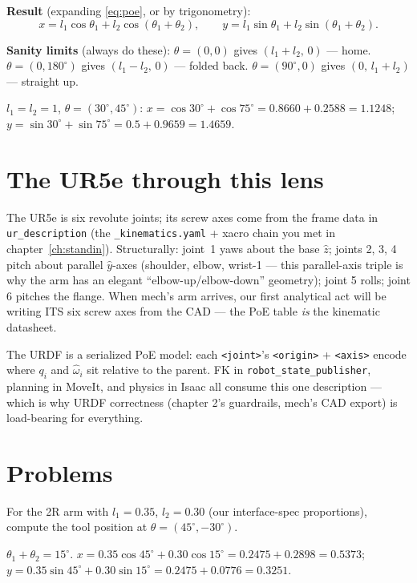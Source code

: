 \textbf{Result} (expanding \eqref{eq:poe}, or by trigonometry):
\begin{equation}
  x = l_1\cos\theta_1 + l_2\cos(\theta_1{+}\theta_2), \qquad
  y = l_1\sin\theta_1 + l_2\sin(\theta_1{+}\theta_2) .
  \label{eq:2rfk}
\end{equation}

\textbf{Sanity limits} (always do these): $\theta = (0,0)$ gives $(l_1{+}l_2,\,0)$ — home.
$\theta = (0, 180^\circ)$ gives $(l_1 - l_2,\, 0)$ — folded back. $\theta = (90^\circ, 0)$
gives $(0,\, l_1{+}l_2)$ — straight up.

\begin{example}[Numbers]
$l_1 = l_2 = 1$, $\theta = (30^\circ, 45^\circ)$:
$x = \cos 30^\circ + \cos 75^\circ = 0.8660 + 0.2588 = 1.1248$;
$y = \sin 30^\circ + \sin 75^\circ = 0.5 + 0.9659 = 1.4659$.
\end{example}

\section{The UR5e through this lens}

The UR5e is six revolute joints; its screw axes come from the frame data in
\texttt{ur\_description} (the \texttt{\_kinematics.yaml} + xacro chain you met in
chapter~\ref{ch:standin}). Structurally: joint~1 yaws about the base $\hat z$; joints 2, 3, 4
pitch about parallel $\hat y$-axes (shoulder, elbow, wrist-1 — this parallel-axis triple is
why the arm has an elegant ``elbow-up/elbow-down'' geometry); joint 5 rolls; joint 6 pitches
the flange. When mech's arm arrives, our first analytical act will be writing ITS six screw
axes from the CAD --- the PoE table \emph{is} the kinematic datasheet.

\begin{keyresult}
The URDF is a serialized PoE model: each \texttt{<joint>}'s \texttt{<origin>} + \texttt{<axis>}
encode where $q_i$ and $\hat\omega_i$ sit relative to the parent. FK in
\texttt{robot\_state\_publisher}, planning in MoveIt, and physics in Isaac all consume this
one description --- which is why URDF correctness (chapter 2's guardrails, mech's CAD export)
is load-bearing for everything.
\end{keyresult}

\section{Problems}

\begin{problem}
For the 2R arm with $l_1 = 0.35$, $l_2 = 0.30$ (our interface-spec proportions), compute the
tool position at $\theta = (45^\circ, -30^\circ)$.
\end{problem}
\begin{answer}
$\theta_1{+}\theta_2 = 15^\circ$.
$x = 0.35\cos45^\circ + 0.30\cos15^\circ = 0.2475 + 0.2898 = 0.5373$;
$y = 0.35\sin45^\circ + 0.30\sin15^\circ = 0.2475 + 0.0776 = 0.3251$.
\end{answer}

